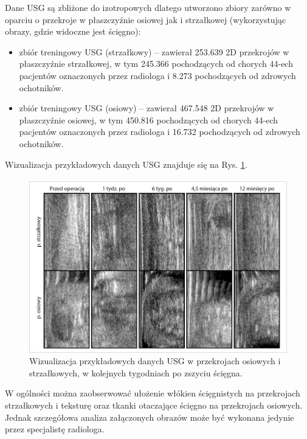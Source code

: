 Dane USG są zbliżone do izotropowych dlatego utworzono zbiory zarówno w oparciu o przekroje w płaszczyźnie osiowej jak i strzałkowej (wykorzystując obrazy, gdzie widoczne jest ścięgno):
\begin{itemize}[noitemsep,nolistsep]
	\item zbiór treningowy USG (strzałkowy) -- zawierał 253.639 2D przekrojów w płaszczyźnie strzałkowej, w tym 245.366 pochodzących od chorych 44-ech pacjentów oznaczonych przez radiologa i 8.273 pochodzących od zdrowych ochotników.
	\item zbiór treningowy USG (osiowy) -- zawierał 467.548 2D przekrojów w płaszczyźnie osiowej, w tym 450.816 pochodzących od chorych 44-ech pacjentów oznaczonych przez radiologa i 16.732 pochodzących od zdrowych ochotników. 
\end{itemize}

Wizualizacja przykładowych danych USG znajduje się na Rys. \ref{fig:US_sample}.
\begin{figure}[h!]
	\includegraphics[width=\textwidth]{figures/Data_US_sample.jpg}
	\caption{Wizualizacja przykładowych danych USG w przekrojach osiowych i strzałkowych, w kolejnych tygodniach po zszyciu ścięgna.}
	\label{fig:US_sample}
\end{figure}
W ogólności można zaobserwować ułożenie włókien ścięgnistych na przekrojach strzałkowych i teksturę oraz tkanki otaczające ścięgno na przekrojach osiowych. Jednak szczegółowa analiza załączonych obrazów może być wykonana jedynie przez specjalistę radiologa. 

